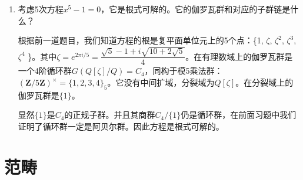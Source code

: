 \documentclass[UTF8]{article}
\begin{document}
\begin{enumerate}
\begin{mdframed}
\end{mdframed}

\item {考虑5次方程$x^5 - 1 = 0$，它是根式可解的。它的伽罗瓦群和对应的子群链是什么？}

根据前一道题目，我们知道方程的根是复平面单位元上的5个点：\{1, $\zeta$, $\zeta^2$, $\zeta^3$, $\zeta^4$ \}。其中$\zeta = e^{2 \pi i / 5} = \dfrac{\sqrt{5} - 1 + i\sqrt{10 + 2 \sqrt{5}}}{4}$。在有理数域上的伽罗瓦群是一个4阶循环群$G(Q[\zeta]/Q) = C_4$，同构于模5乘法群：$(\pmb{Z}/5\pmb{Z})^{\times} = \{1, 2, 3, 4 \}_5$。它没有中间扩域，分裂域为$Q[\zeta]$。在分裂域上的伽罗瓦群是$\{1\}$。

显然$\{1\}$是$C_4$的正规子群。并且其商群$C_4/\{1\}$仍是循环群，在前面习题中我们证明了循环群一定是阿贝尔群。因此方程是根式可解的。

\end{enumerate}

\section{范畴}
\end{document}
